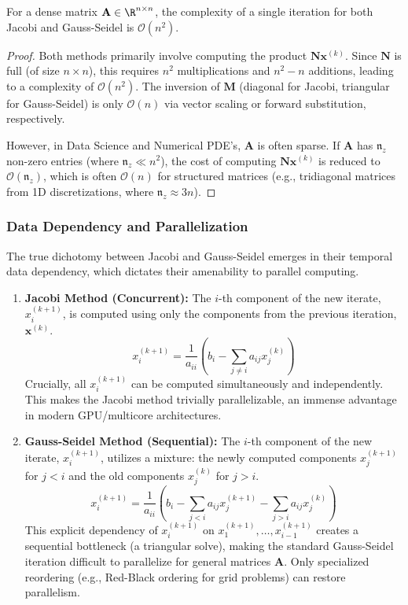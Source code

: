 \begin{proposition}
For a dense matrix $\mathbf{A} \in \R^{n \times n}$, the complexity of a single iteration for both Jacobi and Gauss-Seidel is $\mathcal{O}(n^2)$.
\end{proposition}
\begin{proof}
Both methods primarily involve computing the product $\mathbf{N}\mathbf{x}^{(k)}$. Since $\mathbf{N}$ is full (of size $n \times n$), this requires $n^2$ multiplications and $n^2 - n$ additions, leading to a complexity of $\mathcal{O}(n^2)$. The inversion of $\mathbf{M}$ (diagonal for Jacobi, triangular for Gauss-Seidel) is only $\mathcal{O}(n)$ via vector scaling or forward substitution, respectively.

However, in Data Science and Numerical PDE's, $\mathbf{A}$ is often sparse. If $\mathbf{A}$ has $\mathfrak{n}_z$ non-zero entries (where $\mathfrak{n}_z \ll n^2$), the cost of computing $\mathbf{N}\mathbf{x}^{(k)}$ is reduced to $\mathcal{O}(\mathfrak{n}_z)$, which is often $\mathcal{O}(n)$ for structured matrices (e.g., tridiagonal matrices from 1D discretizations, where $\mathfrak{n}_z \approx 3n$).
\end{proof}

\subsubsection{Data Dependency and Parallelization}

The true dichotomy between Jacobi and Gauss-Seidel emerges in their temporal data dependency, which dictates their amenability to parallel computing.

\begin{enumerate}
    \item \textbf{Jacobi Method (Concurrent):} The $i$-th component of the new iterate, $x_i^{(k+1)}$, is computed using only the components from the previous iteration, $\mathbf{x}^{(k)}$.
    \[ x_i^{(k+1)} = \frac{1}{a_{ii}} \left( b_i - \sum_{j \ne i} a_{ij} x_j^{(k)} \right) \]
    Crucially, all $x_i^{(k+1)}$ can be computed simultaneously and independently. This makes the Jacobi method trivially parallelizable, an immense advantage in modern GPU/multicore architectures.
    
    \item \textbf{Gauss-Seidel Method (Sequential):} The $i$-th component of the new iterate, $x_i^{(k+1)}$, utilizes a mixture: the newly computed components $x_j^{(k+1)}$ for $j < i$ and the old components $x_j^{(k)}$ for $j > i$.
    \[ x_i^{(k+1)} = \frac{1}{a_{ii}} \left( b_i - \sum_{j < i} a_{ij} x_j^{(k+1)} - \sum_{j > i} a_{ij} x_j^{(k)} \right) \]
    This explicit dependency of $x_i^{(k+1)}$ on $x_1^{(k+1)}, \dots, x_{i-1}^{(k+1)}$ creates a sequential bottleneck (a triangular solve), making the standard Gauss-Seidel iteration difficult to parallelize for general matrices $\mathbf{A}$. Only specialized reordering (e.g., Red-Black ordering for grid problems) can restore parallelism.
\end{enumerate}

